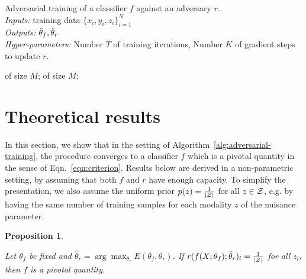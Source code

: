 \documentclass{article}
\theoremstyle{plain}
\newtheorem{proposition}[theorem]{Proposition}
\begin{document}
\begin{algorithm}
\caption{Adversarial training of a classifier $f$ against an adversary $r$.\\
{\it Inputs:} training data $\{ x_i, y_i, z_i \}_{i=1}^N$\\
{\it Outputs:} $\smash{\hat\theta_f}, \smash{\hat\theta_r}$\\
{\it Hyper-parameters:} Number $T$ of training iterations, Number $K$ of gradient steps to update $r$.}
\label{alg:adversarial-training}
\begin{algorithmic}[1]
         
             of size $M$;
        \EndFor
         of size $M$; 
    \EndFor
\end{algorithmic}
\end{algorithm}


\section{Theoretical results}

In this section, we show that in the setting of
Algorithm~\ref{alg:adversarial-training}, the procedure converges to a
classifier $f$ which is a pivotal quantity in the sense of
Eqn.~\ref{eqn:criterion}. Results below are derived in a non-parametric setting,
by assuming that both $f$ and $r$ have enough capacity. To simplify the
presentation, we also assume the uniform prior $p(z) =
\frac{1}{|{\cal Z}|}$ for all $z \in {\cal Z}$, e.g. by having the same
number of training samples for each modality $z$ of the nuisance
parameter.


\begin{proposition}\label{prop:1}

Let $\theta_f$ be fixed and $\hat\theta_r = \arg \max_{\theta_r} E(\theta_f,
\theta_r)$. If $r(f(X;\theta_f) ; \hat\theta_r )_l = \frac{1}{|{\cal Z}|}$
for all $z_l$, then $f$ is a pivotal quantity.

\end{proposition}
\end{document}
